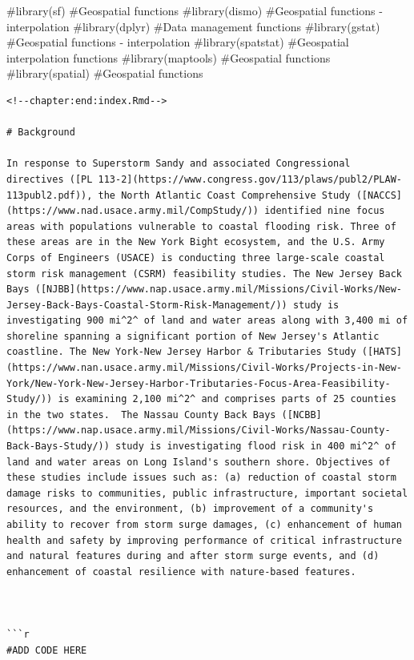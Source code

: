 \documentclass[
]{book}
\begin{document}
\#library(sf) \#Geospatial functions
\#library(dismo) \#Geospatial functions - interpolation
\#library(dplyr) \#Data management functions
\#library(gstat) \#Geospatial functions - interpolation
\#library(spatstat) \#Geospatial interpolation functions
\#library(maptools) \#Geospatial functions
\#library(spatial) \#Geospatial functions

\begin{verbatim}
<!--chapter:end:index.Rmd-->

# Background

In response to Superstorm Sandy and associated Congressional directives ([PL 113-2](https://www.congress.gov/113/plaws/publ2/PLAW-113publ2.pdf)), the North Atlantic Coast Comprehensive Study ([NACCS](https://www.nad.usace.army.mil/CompStudy/)) identified nine focus areas with populations vulnerable to coastal flooding risk. Three of these areas are in the New York Bight ecosystem, and the U.S. Army Corps of Engineers (USACE) is conducting three large-scale coastal storm risk management (CSRM) feasibility studies. The New Jersey Back Bays ([NJBB](https://www.nap.usace.army.mil/Missions/Civil-Works/New-Jersey-Back-Bays-Coastal-Storm-Risk-Management/)) study is investigating 900 mi^2^ of land and water areas along with 3,400 mi of shoreline spanning a significant portion of New Jersey's Atlantic coastline. The New York-New Jersey Harbor & Tributaries Study ([HATS](https://www.nan.usace.army.mil/Missions/Civil-Works/Projects-in-New-York/New-York-New-Jersey-Harbor-Tributaries-Focus-Area-Feasibility-Study/)) is examining 2,100 mi^2^ and comprises parts of 25 counties in the two states.  The Nassau County Back Bays ([NCBB](https://www.nap.usace.army.mil/Missions/Civil-Works/Nassau-County-Back-Bays-Study/)) study is investigating flood risk in 400 mi^2^ of land and water areas on Long Island's southern shore. Objectives of these studies include issues such as: (a) reduction of coastal storm damage risks to communities, public infrastructure, important societal resources, and the environment, (b) improvement of a community's ability to recover from storm surge damages, (c) enhancement of human health and safety by improving performance of critical infrastructure and natural features during and after storm surge events, and (d) enhancement of coastal resilience with nature-based features.



```r
#ADD CODE HERE
\end{verbatim}
\end{document}
